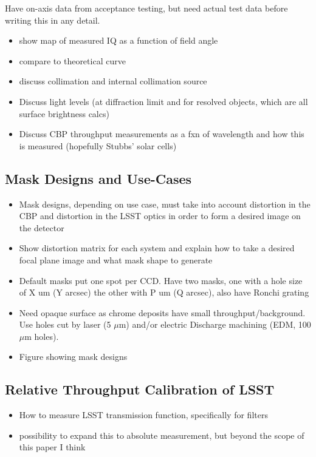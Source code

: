 Have on-axis data from acceptance testing, but need actual test data before writing this in any detail.

\begin{itemize}
	\item show map of measured IQ as a function of field angle
	\item compare to theoretical curve
	\item discuss collimation and internal collimation source
	\item Discuss light levels (at diffraction limit and for resolved objects, which are all surface brightness calcs)
	\item Discuss CBP throughput measurements as a fxn of wavelength and how this is measured (hopefully Stubbs' solar cells)
\end{itemize}

\subsection{Mask Designs and Use-Cases}

\begin{itemize}
	\item Mask designs, depending on use case, must take into account distortion in the CBP and distortion in the LSST optics in order to form a desired image on the detector
	\item Show distortion matrix for each system and explain how to take a desired focal plane image and what mask shape to generate
	\item Default masks put one spot per CCD. Have two masks, one with a hole size of X um (Y arcsec) the other with P um (Q arcsec), also have Ronchi grating
	\item Need opaque surface as chrome deposits have small throughput/background. Use holes cut by laser (5 $\mu$m) and/or electric Discharge machining (EDM, 100 $\mu$m holes). 
	\item Figure showing mask designs
\end{itemize}


\subsection{Relative Throughput Calibration of LSST}

\begin{itemize}
	\item How to measure LSST transmission function, specifically for filters
	\item possibility to expand this to absolute measurement, but beyond the scope of this paper I think
\end{itemize}

